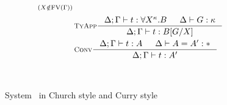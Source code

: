 \begin{figure}
\begin{singlespace}
\begin{minipage}{.46\textwidth}
\begin{align*}
	 \begin{smallmatrix}(X\notin\FV(\Gamma))\end{smallmatrix} \\
& \inference[\sc TyApp]{\Delta;\Gamma |- t : \forall X^\kappa.B & \Delta |- G:\kappa}
                       {\Delta;\Gamma |- t : B[G/X]} \\
& \inference[\sc Conv]{\Delta;\Gamma |- t : A & \Delta |- A = A' : *}
                      {\Delta;\Gamma |- t : A'}
\end{align*}
\end{minipage}
~\\
\caption{System \Fw\ in Church style and Curry style}
\label{fig:fw}
\end{singlespace}
\end{figure}

